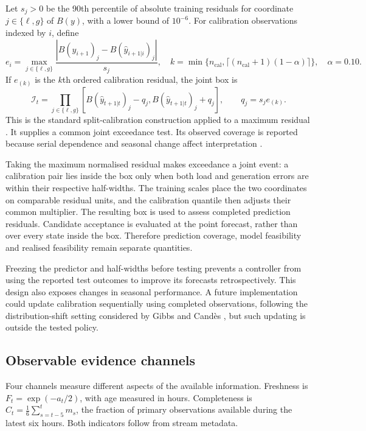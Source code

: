 \documentclass[preprint,12pt]{elsarticle}
\begin{document}
Let $s_j>0$ be the 90th percentile of absolute training residuals for coordinate $j\in\{\ell,g\}$ of $B(y)$, with a lower bound of $10^{-6}$. For calibration observations indexed by $i$, define
\begin{equation}
e_i=\max_{j\in\{\ell,g\}}\frac{|B(y_{i+1})_j-B(\widehat y_{i+1|i})_j|}{s_j},\quad
k=\min\{n_{\mathrm{cal}},\lceil(n_{\mathrm{cal}}+1)(1-\alpha)\rceil\},\quad \alpha=0.10.
\label{eq:calibration}
\end{equation}
If $e_{(k)}$ is the $k$th ordered calibration residual, the joint box is
\begin{equation}
\mathcal I_t=\prod_{j\in\{\ell,g\}}
[B(\widehat y_{t+1|t})_j-q_j,B(\widehat y_{t+1|t})_j+q_j],\qquad q_j=s_je_{(k)}.
\label{eq:interval}
\end{equation}
This is the standard split-calibration construction applied to a maximum residual \cite{angelopoulos}. It supplies a common joint exceedance test. Its observed coverage is reported because serial dependence and seasonal change affect interpretation \cite{oliveira}.

Taking the maximum normalised residual makes exceedance a joint event: a calibration pair lies inside the box only when both load and generation errors are within their respective half-widths. The training scales place the two coordinates on comparable residual units, and the calibration quantile then adjusts their common multiplier. The resulting box is used to assess completed prediction residuals. Candidate acceptance is evaluated at the point forecast, rather than over every state inside the box. Therefore prediction coverage, model feasibility and realised feasibility remain separate quantities.

Freezing the predictor and half-widths before testing prevents a controller from using the reported test outcomes to improve its forecasts retrospectively. This design also exposes changes in seasonal performance. A future implementation could update calibration sequentially using completed observations, following the distribution-shift setting considered by Gibbs and Cand\`es \cite{gibbs}, but such updating is outside the tested policy.


\subsection{Observable evidence channels}
Four channels measure different aspects of the available information. Freshness is $F_t=\exp(-a_t/2)$, with age measured in hours. Completeness is $C_t=\frac{1}{6}\sum_{s=t-5}^{t}m_s$, the fraction of primary observations available during the latest six hours. Both indicators follow from stream metadata.
\end{document}
